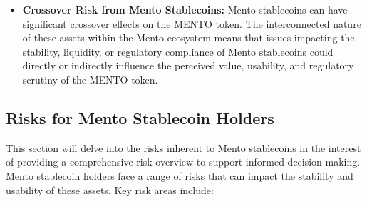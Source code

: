 \documentclass[a4paper]{article}
\theoremstyle{definition}
\begin{document}
\begin{itemize}
    \item \textbf{Crossover Risk from Mento Stablecoins:} Mento stablecoins can have significant crossover effects on the MENTO token. The interconnected nature of these assets within the Mento ecosystem means that issues impacting the stability, liquidity, or regulatory compliance of Mento stablecoins could directly or indirectly influence the perceived value, usability, and regulatory scrutiny of the MENTO token.
\end{itemize}

\subsection{Risks for Mento Stablecoin Holders}
This section will  delve into the risks inherent to Mento stablecoins in the interest of providing a comprehensive risk overview to support informed decision-making. 
Mento stablecoin holders face a range of risks that can impact the stability and usability of these assets. Key risk areas include:
\end{document}
